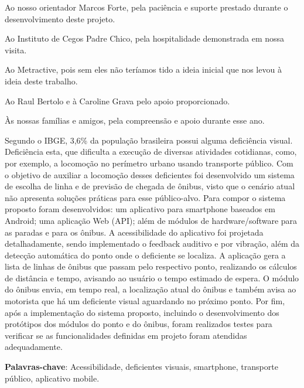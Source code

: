 \documentclass[
	12pt,				%
	oneside,			%
	a4paper,			%
	brazil				%
]{abntex2}
\begin{document}
\begin{agradecimentos} 
Ao nosso orientador Marcos Forte, pela paciência e suporte prestado durante o desenvolvimento deste projeto.

Ao Instituto de Cegos Padre Chico, pela hospitalidade demonstrada em nossa visita.

Ao Metractive, pois sem eles não teríamos tido a ideia inicial que nos levou à ideia deste trabalho.

Ao Raul Bertolo e à Caroline Grava pelo apoio proporcionado.

Às nossas famílias e amigos, pela compreensão e apoio durante esse ano.
\end{agradecimentos} 


\setlength{\absparsep}{18pt} %
\begin{resumo}
 
Segundo o IBGE, 3,6\% da população brasileira possui alguma deficiência visual. Deficiência esta, que dificulta a execução de diversas atividades cotidianas, como, por exemplo, a locomoção no perímetro urbano usando transporte público. Com o objetivo de auxiliar a locomoção desses deficientes foi desenvolvido um sistema de escolha de linha e de previsão de chegada de ônibus, visto que o cenário atual não apresenta soluções práticas para esse público-alvo. Para compor o sistema proposto foram desenvolvidos: um aplicativo para smartphone baseados em Android; uma aplicação Web (API); além de módulos de hardware/software para as paradas e para os ônibus. A acessibilidade do aplicativo foi projetada detalhadamente, sendo implementado o feedback auditivo e por vibração, além da detecção automática do ponto onde o deficiente se localiza.  A aplicação gera a lista de linhas de ônibus que passam pelo respectivo ponto, realizando os cálculos de distância e tempo, avisando ao usuário o tempo estimado de espera. O módulo do ônibus envia, em tempo real, a localização atual do ônibus e também avisa ao motorista que há um deficiente visual aguardando no próximo ponto.  Por fim, após a implementação do sistema proposto, incluindo o desenvolvimento dos protótipos dos módulos do ponto e do ônibus, foram realizados testes para verificar se as funcionalidades definidas em projeto foram atendidas adequadamente. 

 \textbf{Palavras-chave}: Acessibilidade, deficientes visuais, smartphone, transporte público, aplicativo mobile.
\end{resumo}
\end{document}

